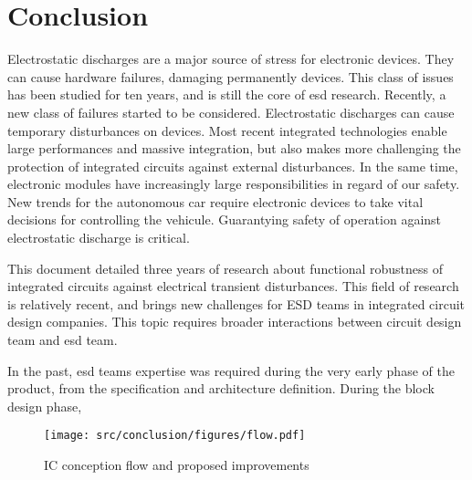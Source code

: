 \chapter{Conclusion}
\label{sec:final-conclusion}

Electrostatic discharges are a major source of stress for electronic devices.
They can cause hardware failures, damaging permanently devices.
This class of issues has been studied for ten years, and is still the core of \gls{esd} research.
Recently, a new class of failures started to be considered.
Electrostatic discharges can cause temporary disturbances on devices.
Most recent integrated technologies enable large performances and massive integration, but also makes more challenging the protection of integrated circuits against external disturbances.
In the same time, electronic modules have increasingly large responsibilities in regard of our safety.
New trends for the autonomous car require electronic devices to take vital decisions for controlling the vehicule.
Guarantying safety of operation against electrostatic discharge is critical.

This document detailed three years of research about functional robustness of integrated circuits against electrical transient disturbances.
This field of research is relatively recent, and brings new challenges for \gls{ESD} teams in integrated circuit design companies.
This topic requires broader interactions between circuit design team and \gls{esd} team.

In the past, \gls{esd} teams expertise was required during the very early phase of the product, from the specification and architecture definition.
During the block design phase,

\begin{figure}[!h]
  \centering
  \texttt{[image: src/conclusion/figures/flow.pdf]}
  \caption{IC conception flow and proposed improvements}
  \label{fig:new-flow}
\end{figure}

